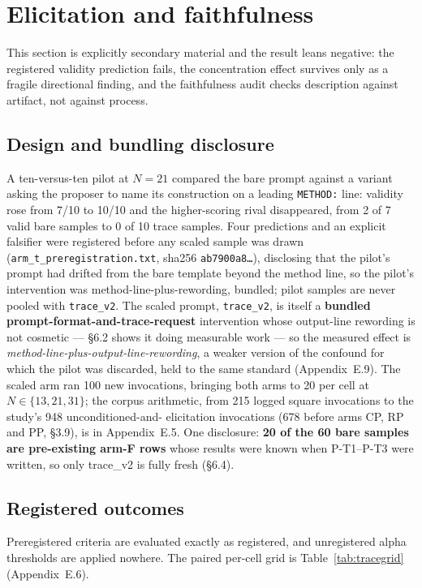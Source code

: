 \section{Elicitation and faithfulness}

This section is explicitly secondary material and the result leans negative: the registered
validity prediction fails, the concentration effect survives only as a fragile directional
finding, and the faithfulness audit checks description against artifact, not against process.

\subsection{Design and bundling disclosure}

A ten-versus-ten pilot at $N = 21$ compared the bare prompt against a variant asking the proposer
to name its construction on a leading \texttt{METHOD:} line: validity rose from 7/10 to 10/10 and
the higher-scoring rival disappeared, from 2 of 7 valid bare samples to 0 of 10 trace samples. Four
predictions and an explicit falsifier were registered before any scaled sample was drawn
(\texttt{arm\_t\_preregistration.txt}, sha256 \texttt{ab7900a8\ldots}), disclosing that the pilot's
prompt had drifted from the bare template beyond the method line, so the pilot's intervention was
method-line-plus-rewording, bundled; pilot samples are never pooled with \texttt{trace\_v2}. The
scaled prompt, \texttt{trace\_v2}, is itself a \textbf{bundled prompt-format-and-trace-request}
intervention whose output-line rewording is not cosmetic --- \S6.2 shows it doing measurable work
--- so the measured effect is \emph{method-line-plus-output-line-rewording}, a weaker version of
the confound for which the pilot was discarded, held to the same standard (Appendix~E.9). The
scaled arm ran 100 new invocations, bringing both arms to 20 per cell at $N \in \{13, 21, 31\}$;
the corpus arithmetic, from 215 logged square invocations to the study's 948 unconditioned-and-
elicitation invocations (678 before arms CP, RP and PP, \S3.9), is in Appendix~E.5. One disclosure: \textbf{20 of the 60 bare samples are
pre-existing arm-F rows} whose results were known when P-T1--P-T3 were written, so only trace\_v2
is fully fresh (\S6.4).

\subsection{Registered outcomes}

Preregistered criteria are evaluated exactly as registered, and unregistered alpha thresholds are
applied nowhere. The paired per-cell grid is Table~\ref{tab:tracegrid} (Appendix~E.6).

